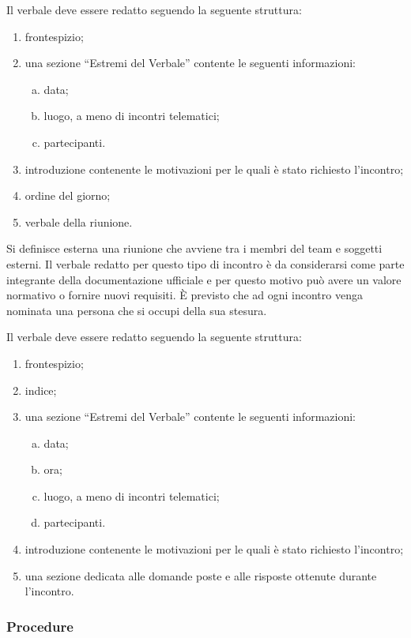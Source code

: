 \documentclass[../NormeProgetto.tex]{subfiles}
\begin{document}
			Il verbale deve essere redatto seguendo la seguente struttura:
			\begin{enumerate}
				\item frontespizio;
				\item una sezione ``Estremi del Verbale'' contente le seguenti informazioni:
				\begin{enumerate}[a.]
					\item data;
					\item luogo, a meno di incontri telematici;
					\item partecipanti.
				\end{enumerate}
				\item introduzione contenente le motivazioni per le quali è stato richiesto l'incontro;
				\item ordine del giorno;
				\item verbale della riunione.
			\end{enumerate}

			Si definisce esterna una riunione che avviene tra i membri del team e soggetti esterni. Il verbale redatto per questo tipo di incontro è da considerarsi come parte integrante della documentazione ufficiale e per questo motivo può avere un valore normativo o fornire nuovi requisiti. È previsto che ad ogni incontro venga nominata una persona che si occupi della sua stesura.
			
			Il verbale deve essere redatto seguendo la seguente struttura:
			\begin{enumerate}
				\item frontespizio;
				\item indice;
				\item una sezione ``Estremi del Verbale'' contente le seguenti informazioni:
				\begin{enumerate}[a.]
					\item data;
					\item ora;
					\item luogo, a meno di incontri telematici;
					\item partecipanti.
				\end{enumerate}
				\item introduzione contenente le motivazioni per le quali è stato richiesto l'incontro;
				\item una sezione dedicata alle domande poste e alle risposte ottenute durante l'incontro.
			\end{enumerate}
	\subsubsection{Procedure}		
\end{document}
